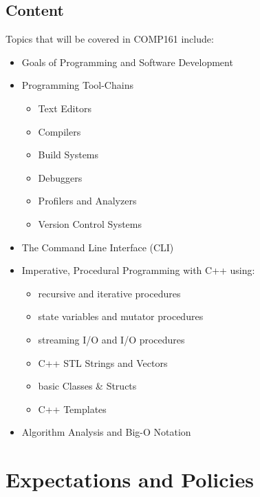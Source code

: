 \documentclass[10pt]{article}
\begin{document}
\subsection{Content}

Topics that will be covered in COMP161 include:
\begin{itemize}
\item Goals of Programming and Software Development
\item Programming Tool-Chains
\begin{itemize}
\item Text Editors
\item Compilers
\item Build Systems
\item Debuggers
\item Profilers and Analyzers
\item Version Control Systems
\end{itemize}
\item The Command Line Interface (CLI)
\item Imperative, Procedural Programming with C++ using:
\begin{itemize}
\item recursive and iterative procedures
\item state variables and mutator procedures
\item streaming I/O and I/O procedures
\item C++ STL Strings and Vectors
\item basic Classes \& Structs
\item C++ Templates
\end{itemize}
\item Algorithm Analysis and Big-O Notation
\end{itemize}

\section{Expectations and Policies}
\end{document}
